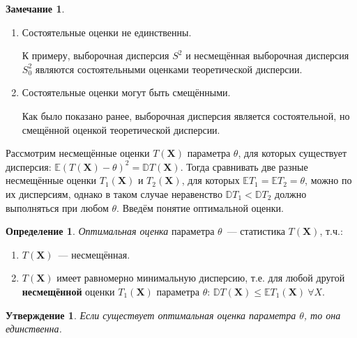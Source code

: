 \documentclass[oneside,final,14pt]{extreport}
\theoremstyle{plain}
\newtheorem*{thm*}{Утверждение}
\theoremstyle{definition}
\newtheorem*{defn}{Определение}
\newtheorem*{rmrk}{Замечание}
\theoremstyle{named}
\begin{document}
\begin{rmrk}
\begin{enumerate}
    \item Состоятельные оценки не единственны.
    
    К примеру, выборочная дисперсия $S^{2}$ и несмещённая выборочная дисперсия $S_0^{2}$ являются состоятельными оценками теоретической дисперсии.
    
    \item Состоятельные оценки могут быть смещёнными.
    
    Как было показано ранее, выборочная дисперсия является состоятельной, но смещённой оценкой теоретической дисперсии.
    
    \end{enumerate}
\end{rmrk}

Рассмотрим несмещённые оценки $T(\mathbf{X})$ параметра $\theta$, для которых существует дисперсия: $\mathbb{E}(T(\mathbf{X})-\theta)^{2}=\mathbb{D} T(\mathbf{X})$. Тогда сравнивать две разные несмещённые оценки $T_{1}(\mathbf{X})$ и $T_{2}(\mathbf{X})$, для которых $\mathbb{E}T_{1} = \mathbb{E}T_{2} = \theta$, можно по их дисперсиям, однако в таком случае неравенство $\mathbb{D} T_{1}<\mathbb{D} T_{2}$ должно выполняться при любом $\theta$. Введём понятие оптимальной оценки.
\pagebreak
\begin{defn}
{\it Оптимальная оценка} параметра $\theta$~--- статистика $T(\mathbf{X})$, т.ч.:
\begin{enumerate}
    \item $T(\mathbf{X})$~--- несмещённая.
    \item $T(\mathbf{X})$ имеет равномерно минимальную дисперсию, т.е. для любой другой \textbf{несмещённой} оценки $T_{1}(\mathbf{X})$ параметра $\theta$: $\mathbb{D} T(\mathbf{X}) \leqslant \mathbb{E} T_{1}(\mathbf{X})~ \forall X$.
\end{enumerate}
\end{defn}

\begin{thm*}
Если существует оптимальная оценка параметра $\theta$, то она единственна.
\end{thm*}
\end{document}
